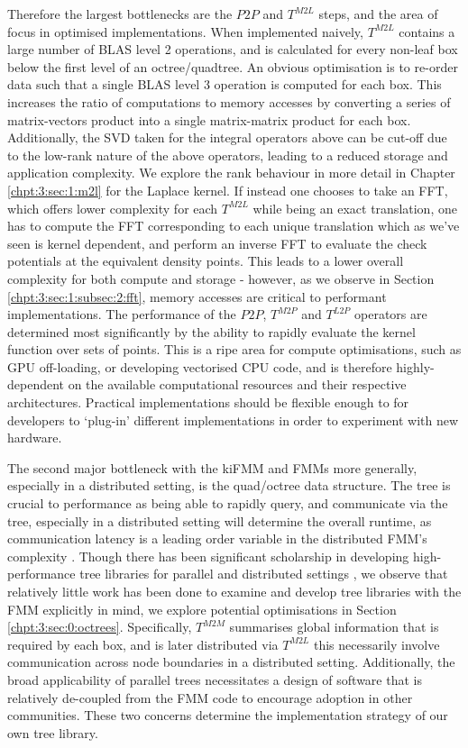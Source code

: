 Therefore the largest bottlenecks are the $P2P$ and $T^{M2L}$ steps, and the area of focus in optimised implementations. When implemented naively, $T^{M2L}$ contains a large number of BLAS level 2 operations, and is calculated for every non-leaf box below the first level of an octree/quadtree. An obvious optimisation is to re-order data such that a single BLAS level 3 operation is computed for each box. This increases the ratio of computations to memory accesses by converting a series of matrix-vectors product into a single matrix-matrix product for each box. Additionally, the SVD taken for the integral operators above can be cut-off due to the low-rank nature of the above operators, leading to a reduced storage and application complexity. We explore the rank behaviour in more detail in Chapter \ref{chpt:3:sec:1:m2l} for the Laplace kernel. If instead one chooses to take an FFT, which offers lower complexity for each $T^{M2L}$ while being an exact translation, one has to compute the FFT corresponding to each unique translation which as we've seen is kernel dependent, and perform an inverse FFT to evaluate the check potentials at the equivalent density points. This leads to a lower overall complexity for both compute and storage - however, as we observe in Section \ref{chpt:3:sec:1:subsec:2:fft}, memory accesses are critical to performant implementations. The performance of the $P2P$, $T^{M2P}$ and $T^{L2P}$ operators are determined most significantly by the ability to rapidly evaluate the kernel function over sets of points. This is a ripe area for compute optimisations, such as GPU off-loading, or developing vectorised CPU code, and is therefore highly-dependent on the available computational resources and their respective architectures. Practical implementations should be flexible enough to for developers to `plug-in' different implementations in order to experiment with new hardware.

The second major bottleneck with the kiFMM and FMMs more generally, especially in a distributed setting, is the quad/octree data structure. The tree is crucial to performance as being able to rapidly query, and communicate via the tree, especially in a distributed setting will determine the overall runtime, as communication latency is a leading order variable in the distributed FMM's complexity \cite{Yokota2014}. Though there has been significant scholarship in developing high-performance tree libraries for parallel and distributed settings \cite{BursteddeWilcoxGhattas11,sundar2008bottom,sundar2013hyksort}, we observe that relatively little work has been done to examine and develop tree libraries with the FMM explicitly in mind, we explore potential optimisations in Section \ref{chpt:3:sec:0:octrees}. Specifically, $T^{M2M}$ summarises global information that is required by each box, and is later distributed via $T^{M2L}$ this necessarily involve communication across node boundaries in a distributed setting. Additionally, the broad applicability of parallel trees necessitates a design of software that is relatively de-coupled from the FMM code to encourage adoption in other communities. These two concerns determine the implementation strategy of our own tree library.

